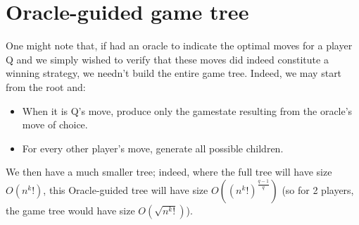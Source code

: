 \documentclass[english, 11pt]{article}
\begin{document}
\section*{Oracle-guided game tree}
One might note that, if had an oracle to indicate the optimal moves for a player Q and we simply wished to verify that these moves did indeed constitute a winning strategy, we needn't build the entire game tree. Indeed, we may start from the root and:
\begin{itemize}
\item When it is Q's move, produce only the gamestate resulting from the oracle's move of choice.
\item For every other player's move, generate all possible children.
\end{itemize}
We then have a much smaller tree; indeed, where the full tree will have size $O(n^k!)$,  this Oracle-guided tree will have size $O((n^k!)^{\frac{q-1}{q}})$ (so for 2 players, the game tree would have size $O(\sqrt{n^k!})$).
\end{document}
